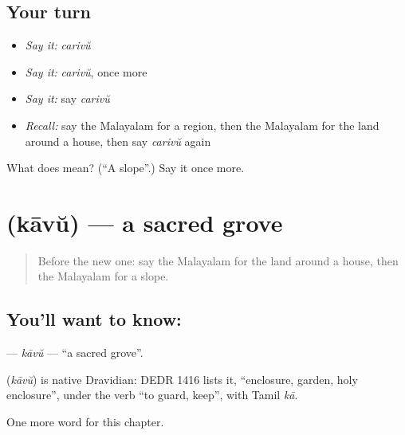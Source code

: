 \subsection*{Your turn}
\begin{itemize}
\raggedright
  \item \emph{Say it:} \emph{carivŭ}
  \item \emph{Say it:} \emph{carivŭ}, once more
  \item \emph{Say it:} say \emph{carivŭ}
  \item \emph{Recall:} say the Malayalam for a region, then the Malayalam for the land around a house, then say \emph{carivŭ} again
\end{itemize}

\begin{tcolorbox}[breakable,colback=teal!4,colframe=teal!35!black,title={Before you move on}]
What does  mean? (\textquotedblleft{}A slope\textquotedblright{}.) Say it once more.
\end{tcolorbox}
\section[\texorpdfstring{\ml{കാവ്} (kāvŭ)}{കാവ് (kāvŭ)}]{ (kāvŭ) — a sacred grove}

\label{lesson:ML-C280-kavu}



\begin{quote}
Before the new one: say the Malayalam for the land around a house, then the Malayalam for a slope.
\end{quote}

\subsection*{You'll want to know: }
\textbf{} — \emph{kāvŭ} — \textquotedblleft{}a sacred grove\textquotedblright{}.

\begin{cousinweb}
\textbf{} (\emph{kāvŭ}) is native Dravidian: DEDR 1416 lists it, \textquotedblleft{}enclosure, garden, holy enclosure\textquotedblright{}, under the verb \textquotedblleft{}to guard, keep\textquotedblright{}, with Tamil \emph{kā}.
\end{cousinweb}

\begin{grammarlens}[title={What you've built}]
One more word for this chapter.
\end{grammarlens}

